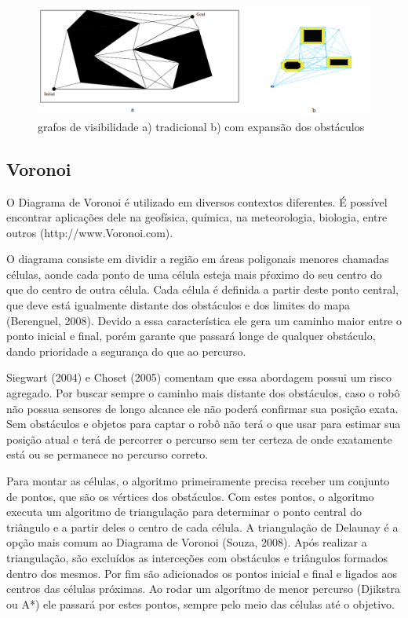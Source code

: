 \begin{figure}[h]
	\centering
	\label{fig07}
		\includegraphics[keepaspectratio=true,scale=0.6]{figuras/7visibilityGraph.png}
	\caption{grafos de visibilidade a) tradicional b) com expansão dos obstáculos }
\end{figure}

\subsection{Voronoi}

O Diagrama de Voronoi é utilizado em diversos contextos diferentes. É possível encontrar aplicações dele na geofísica, química, na meteorologia, biologia, entre outros (http://www.Voronoi.com).

O diagrama consiste em dividir a região em áreas poligonais menores chamadas células, aonde cada ponto de uma célula esteja mais pŕoximo do seu centro do que do centro de outra célula. Cada célula é definida a partir deste ponto central, que deve está igualmente distante dos obstáculos e dos limites do mapa (Berenguel, 2008). Devido a essa característica ele gera um caminho maior entre o ponto inicial e final, porém garante que passará longe de qualquer obstáculo, dando prioridade a segurança do que ao percurso.

Siegwart (2004) e Choset (2005) comentam que essa abordagem possui um risco agregado. Por buscar sempre o caminho mais distante dos obstáculos, caso o robô não possua sensores de longo alcance ele não poderá confirmar sua posição exata. Sem obstáculos e objetos para captar o robô não terá o que usar para estimar sua posição atual e terá de percorrer o percurso sem ter certeza de onde exatamente está ou se permanece no percurso correto.

Para montar as células, o algoritmo primeiramente precisa receber um conjunto de pontos, que são os vértices dos obstáculos. Com estes pontos, o algoritmo executa um algoritmo de triangulação para determinar o ponto central do triângulo e a partir deles o centro de cada célula. A triangulação de Delaunay é a opção mais comum ao Diagrama de Voronoi (Souza, 2008). Após realizar a triangulação, são excluídos as interceções com obstáculos e triângulos formados dentro dos mesmos. Por fim são adicionados os pontos inicial e final e ligados aos centros das células próximas. Ao rodar um algorítmo de menor percurso (Djikstra ou A*) ele passará por estes pontos, sempre pelo meio das células até o objetivo.

